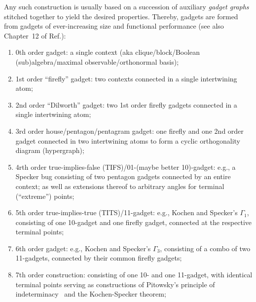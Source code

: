 Any such construction is usually based on a succession of  auxiliary
{\em gadget graphs}~\cite{tutte_1954,SZABO2009436,Ramanathan-18}
stitched together to yield the desired properties.
Thereby, gadgets are formed from gadgets of ever-increasing size and functional performance
(see also Chapter~12 of Ref.\cite{svozil-2016-pu-book}):
\begin{enumerate}

\item 0th order gadget:  a single context (aka clique/block/Boolean (sub)algebra/maximal observable/orthonormal basis);

\item 1st order ``firefly'' gadget: two contexts connected in a single intertwining atom;

\item 2nd order ``Dilworth'' gadget:  two 1st order  firefly  gadgets connected in a single intertwining atom;

\item 3rd order house/pentagon/pentagram gadget:  one firefly and one 2nd order gadget connected in two intertwining atoms to form a cyclic orthogonality diagram (hypergraph);

\item 4rth order true-implies-false (TIFS)/01-(maybe better 10)-gadget:  e.g., a Specker bug consisting of two pentagon gadgets connected by an entire context;
as well as extensions thereof to arbitrary angles for terminal (``extreme'') points;

\item 5th order  true-implies-true (TITS)/11-gadget:  e.g.,  Kochen and Specker's $\Gamma_1$, consisting of one 10-gadget and one firefly gadget,
connected at the respective terminal points;

\item 6th order gadget:  e.g.,  Kochen and Specker's $\Gamma_3$,
consisting of a combo of two 11-gadgets, connected  by their common firefly gadgets;

\item 7th order construction:  consisting of one 10- and one 11-gadget, with identical terminal points serving as constructions of Pitowsky's
principle of indeterminacy~\cite{pitowsky:218,2015-AnalyticKS,svozil-2018-whycontexts} and the Kochen-Specker theorem;

\end{enumerate}

